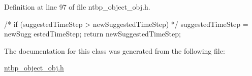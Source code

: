 Definition at line 97 of file ntbp\_\-object\_\-obj.h.




\begin{DoxyCode}
{ /* if (suggestedTimeStep > newSuggestedTimeStep) */ suggestedTimeStep = newSugg
      estedTimeStep; return newSuggestedTimeStep; }
\end{DoxyCode}




The documentation for this class was generated from the following file:\begin{DoxyCompactItemize}
\item 
\hyperlink{ntbp__object__obj_8h}{ntbp\_\-object\_\-obj.h}\end{DoxyCompactItemize}
